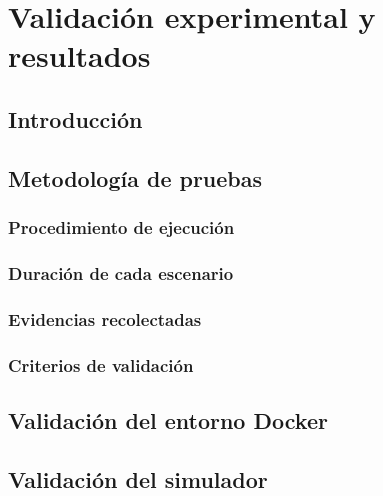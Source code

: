%
%

\chapter{Validación experimental y resultados}
\label{cha:validacion-experimental-resultados}

\section{Introducción}
\label{sec:introduccion-validacion-experimental}


\section{Metodología de pruebas}
\label{sec:metodologia-pruebas}

\subsection{Procedimiento de ejecución}
\label{subsec:procedimiento-ejecucion}

\subsection{Duración de cada escenario}
\label{subsec:duracion-cada-escenario}

\subsection{Evidencias recolectadas}
\label{subsec:evidencias-recolectadas}

\subsection{Criterios de validación}
\label{subsec:criterios-validacion-pruebas}


\section{Validación del entorno Docker}
\label{sec:validacion-entorno-docker}


\section{Validación del simulador}
\label{sec:validacion-simulador}


